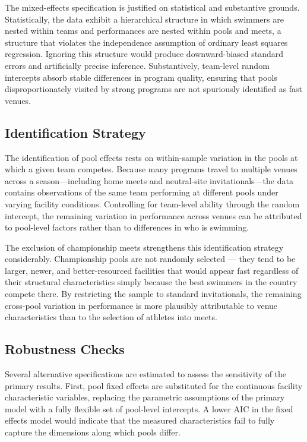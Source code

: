 \documentclass[12pt]{article}
\begin{document}
The mixed-effects specification is justified on statistical and substantive
grounds. Statistically, the data exhibit a hierarchical structure in which
swimmers are nested within teams and performances are nested within pools and
meets, a structure that violates the independence assumption of ordinary least
squares regression. Ignoring this structure would produce downward-biased
standard errors and artificially precise inference. Substantively, team-level
random intercepts absorb stable differences in program quality, ensuring that
pools disproportionately visited by strong programs are not spuriously
identified as fast venues.

\subsection{Identification Strategy}

The identification of pool effects rests on within-sample variation in the
pools at which a given team competes. Because many programs travel to multiple
venues across a season---including home meets and neutral-site
invitationals---the data contains observations of the same team performing at
different pools under varying facility conditions. Controlling for team-level
ability through the random intercept, the remaining variation in performance
across venues can be attributed to pool-level factors rather than to differences
in who is swimming.

The exclusion of championship meets strengthens this identification strategy
considerably. Championship pools are not randomly selected --- they tend to be
larger, newer, and better-resourced facilities that would appear fast regardless
of their structural characteristics simply because the best swimmers in the
country compete there. By restricting the sample to standard invitationals, the
remaining cross-pool variation in performance is more plausibly attributable to
venue characteristics than to the selection of athletes into meets.

\subsection{Robustness Checks}

Several alternative specifications are estimated to assess the sensitivity of
the primary results. First, pool fixed effects are substituted for the
continuous facility characteristic variables, replacing the parametric
assumptions of the primary model with a fully flexible set of pool-level
intercepts. A lower AIC in the fixed effects model would indicate that the
measured characteristics fail to fully capture the dimensions along which pools
differ.
\end{document}

